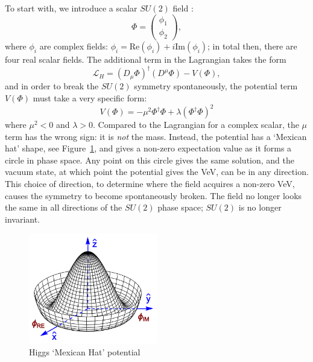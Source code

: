 To start with, we introduce a scalar $SU(2)$ field \phi:
\begin{equation}
\Phi =
\left(
\begin{array}{c}
\phi_{1} \\
\phi_{2}
\end{array}
\right),
\end{equation}
where $\phi_{i}$ are complex fields: 
$\phi_{i} = \text{Re}( \phi_{i} ) + i\text{Im} (\phi_{i})$; 
in total then, there are four real scalar fields.
The additional term in the Lagrangian takes the form
%
\begin{equation}
\mathcal{L}_{H} = (D_{\mu}\Phi)^{\dag}(D^{\mu}\Phi) - V(\Phi),
\end{equation}
%
and in order to break the $SU(2)$ symmetry spontaneously, the potential term $V(\Phi)$ must take a very specific form:
\begin{equation}
V(\Phi) = -\mu^{2} \Phi^{\dag}\Phi + \lambda (\Phi^{\dag} \Phi)^{2}
\label{eq:HiggsPot}
\end{equation}
where $\mu^{2} < 0$ and $\lambda > 0$.
Compared to the Lagrangian for a complex scalar, the $\mu$ term has the wrong sign: it is {\it not} the mass.
Instead, the potential has a `Mexican hat' shape, see Figure~\ref{fig:MexHat}, and gives a non-zero expectation value as it forms a circle in phase space. 
Any point on this circle gives the same solution, and the vacuum state, at which point the potential gives the \ac{VeV},
can be in any direction.
This choice of direction, to determine where the field acquires a non-zero \ac{VeV}, causes the symmetry to become spontaneously broken.
The field no longer looks the same in all directions of the $SU(2)$ phase space; $SU(2)$ is no longer invariant.

\begin{figure}[htbp]
  \begin{center}
  \includegraphics[width=0.5\textwidth]{Figures/theory/higgsPotential}
  \caption{Higgs `Mexican Hat' potential}
  \label{fig:MexHat}
  \end{center}
\end{figure}

